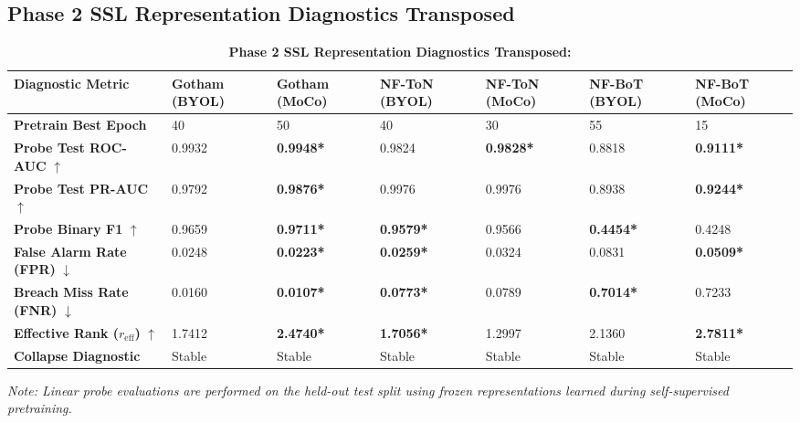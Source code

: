 \documentclass[10pt,a4paper]{article}
\newcommand{\best}[1]{\textbf{\textcolor{bestgreen}{#1*}}}
\begin{document}
\subsection{Phase 2 SSL Representation Diagnostics Transposed}
\begin{table}[htbp]
\centering
\small
\caption{\textbf{Phase 2 SSL Representation Diagnostics Transposed:}}
\begin{tabularx}{\textwidth}{lXXXXXX}
\toprule
\textbf{Diagnostic Metric} & \textbf{Gotham (BYOL)} & \textbf{Gotham (MoCo)} & \textbf{NF-ToN (BYOL)} & \textbf{NF-ToN (MoCo)} & \textbf{NF-BoT (BYOL)} & \textbf{NF-BoT (MoCo)} \\
\midrule
\textbf{Pretrain Best Epoch} & 40 & 50 & 40 & 30 & 55 & 15 \\
\textbf{Probe Test ROC-AUC} $\uparrow$ & 0.9932 & \best{0.9948} & 0.9824 & \best{0.9828} & 0.8818 & \best{0.9111} \\
\textbf{Probe Test PR-AUC} $\uparrow$ & 0.9792 & \best{0.9876} & 0.9976 & 0.9976 & 0.8938 & \best{0.9244} \\
\textbf{Probe Binary F1} $\uparrow$ & 0.9659 & \best{0.9711} & \best{0.9579} & 0.9566 & \best{0.4454} & 0.4248 \\
\textbf{False Alarm Rate (FPR)} $\downarrow$ & 0.0248 & \best{0.0223} & \best{0.0259} & 0.0324 & 0.0831 & \best{0.0509} \\
\textbf{Breach Miss Rate (FNR)} $\downarrow$ & 0.0160 & \best{0.0107} & \best{0.0773} & 0.0789 & \best{0.7014} & 0.7233 \\
\textbf{Effective Rank ($r_{\text{eff}}$)} $\uparrow$ & 1.7412 & \best{2.4740} & \best{1.7056} & 1.2997 & 2.1360 & \best{2.7811} \\
\textbf{Collapse Diagnostic} & Stable & Stable & Stable & Stable & Stable & Stable \\
\bottomrule
\end{tabularx}
\vspace{2pt}
\noindent\textit{Note: Linear probe evaluations are performed on the held-out test split using frozen representations learned during self-supervised pretraining.}
\label{tab:ssl_transposed}
\end{table}
\end{document}

